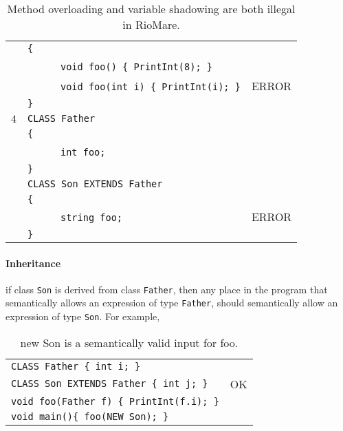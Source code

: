 \documentclass{article}
\begin{document}
\begin{table}[h]
\begin{tabular}{|l|l|l|}
     & \verb"{"                                       &       \\
     & ~ ~ ~ ~\verb"void foo() { PrintInt(8); }"      &       \\
     & ~ ~ ~ ~\verb"void foo(int i) { PrintInt(i); }" & ERROR \\
     & \verb"}"                                       &       \\
\hline
 $4$ & \verb"CLASS Father"             &       \\
     & \verb"{"                        &       \\
     & ~ ~ ~ ~\verb"int foo;"          &       \\
     & \verb"}"                        &       \\
     & \verb"CLASS Son EXTENDS Father" &       \\
     & \verb"{"                        &       \\
     & ~ ~ ~ ~\verb"string foo;"       & ERROR \\
     & \verb"}"                        &       \\
\hline
\end{tabular}
\caption{Method overloading and variable shadowing are both illegal in RioMare.
\label{Table_Code_Examples_Overload_Override}}
\end{table}
\newpage
\paragraph{Inheritance} if class \verb"Son" is derived from class \verb"Father",
then any place in the program that semantically allows an expression of type \verb"Father",
should semantically allow an expression of type \verb"Son".
For example,
\begin{table}[h]
\centering
\begin{tabular}{ | l  | l | }
\hline
\verb"CLASS Father { int i; }"               &    \\
\verb"CLASS Son EXTENDS Father { int j; }"   & OK \\
\verb"void foo(Father f) { PrintInt(f.i); }" &    \\
\verb"void main(){ foo(NEW Son); }"          &    \\
\hline
\end{tabular}
\caption{new Son is a semantically valid input for foo.
\label{Table_Code_Examples_Son_Class_Instead_Of_Father_Class}}
\end{table}
\end{document}
